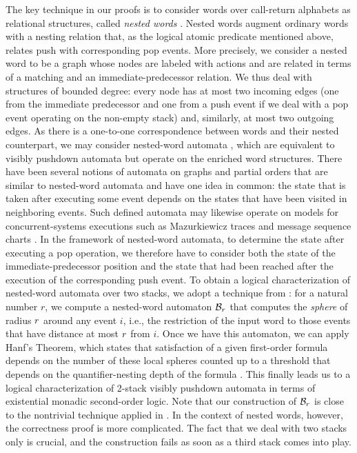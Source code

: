 \documentclass{LMCS}
\begin{document}
The key technique in our proofs is to consider words over call-return
alphabets as relational structures, called \emph{nested words} \cite{AlurM06}.
Nested words augment ordinary words with a nesting relation that, as the
logical atomic predicate mentioned above, relates push with corresponding pop
events. More precisely, we consider a nested word to be a graph whose nodes
are labeled with actions and are related in terms of a matching and an
immediate-predecessor relation. We thus deal with structures of bounded
degree: every node has at most two incoming edges (one from the immediate
predecessor and one from a push event if we deal with a pop event operating on
the non-empty stack) and, similarly, at most two outgoing edges. As there is a
one-to-one correspondence between words and their nested counterpart, we may
consider nested-word automata \cite{AlurM06}, which are equivalent to visibly
pushdown automata but operate on the enriched word structures. There have been
several notions of automata on graphs and partial orders
\cite{Tho-automata-ttp,ThoPOMIV96} that are similar to nested-word automata
and have one idea in common: the state that is taken after executing some
event depends on the states that have been visited in neighboring events. Such
defined automata may likewise operate on models for concurrent-systems
executions such as Mazurkiewicz traces \cite{Droste2000} and message sequence
charts \cite{BolligJournal}. In the framework of nested-word automata, to
determine the state after executing a pop operation, we therefore have to
consider both the state of the immediate-predecessor position and the state
that had been reached after the execution of the corresponding push event. To
obtain a logical characterization of nested-word automata over two stacks, we
adopt a technique from \cite{BolligJournal}: for a natural number $r$, we
compute a nested-word automaton $\mathcal{B}_r$ that computes the \emph{sphere}
of radius $r$ around any event $i$, i.e., the restriction of the input
word to those events that have distance at most $r$ from $i$. Once we
have this automaton, we can apply Hanf's Theorem, which states that
satisfaction of a given first-order formula depends on the number of these
local spheres counted up to a threshold that depends on the quantifier-nesting
depth of the formula \cite{Hanf1965}. This finally leads us to a logical
characterization of 2-stack visibly pushdown automata in terms of existential
monadic second-order logic. Note that our construction of $\mathcal{B}_r$ is
close to the nontrivial technique applied in \cite{BolligJournal}. In the
context of nested words, however, the correctness proof is more complicated.
The fact that we deal with two stacks only is crucial, and the construction
fails as soon as a third stack comes into play.
\end{document}
